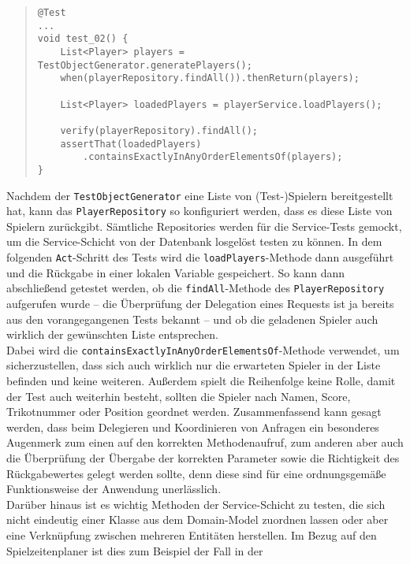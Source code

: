 \pagebreak

\begin{quote}
\begin{verbatim}
@Test
...
void test_02() {
    List<Player> players = TestObjectGenerator.generatePlayers();
    when(playerRepository.findAll()).thenReturn(players);

    List<Player> loadedPlayers = playerService.loadPlayers();

    verify(playerRepository).findAll();
    assertThat(loadedPlayers)
        .containsExactlyInAnyOrderElementsOf(players);
}
\end{verbatim}
\end{quote}

Nachdem der \texttt{TestObjectGenerator} eine Liste von (Test-)Spielern 
bereitgestellt hat, kann das \texttt{PlayerRepository} so konfiguriert werden, dass 
es diese Liste von Spielern zurückgibt. Sämtliche Repositories werden für die 
Service-Tests gemockt, um die Service-Schicht von der Datenbank losgelöst testen zu 
können. In dem folgenden \texttt{Act}-Schritt des Tests wird die 
\texttt{loadPlayers}-Methode dann ausgeführt und die Rückgabe in einer lokalen 
Variable gespeichert. So kann dann abschließend getestet werden, ob die 
\texttt{findAll}-Methode des \texttt{PlayerRepository} aufgerufen wurde -- die 
Überprüfung der Delegation eines Requests ist ja bereits aus den vorangegangenen 
Tests bekannt -- und ob die geladenen Spieler auch wirklich der gewünschten Liste 
entsprechen. \\ 
Dabei wird die \texttt{containsExactlyInAnyOrderElementsOf}-Methode verwendet, um 
sicherzustellen, dass sich auch wirklich nur die erwarteten Spieler in der Liste 
befinden und keine weiteren. Außerdem spielt die Reihenfolge keine Rolle, damit der 
Test auch weiterhin besteht, sollten die Spieler nach Namen, Score, Trikotnummer oder 
Position geordnet werden. 
Zusammenfassend kann gesagt werden, dass beim Delegieren und Koordinieren von 
Anfragen ein besonderes Augenmerk zum einen auf den korrekten Methodenaufruf, zum 
anderen aber auch die Überprüfung der Übergabe der korrekten Parameter sowie 
die Richtigkeit des Rückgabewertes gelegt werden sollte, denn diese sind für eine 
ordnungsgemäße Funktionsweise der Anwendung unerlässlich. \\ 
Darüber hinaus ist es wichtig Methoden der Service-Schicht zu testen, die sich nicht 
eindeutig einer Klasse aus dem Domain-Model zuordnen lassen oder aber eine 
Verknüpfung zwischen mehreren Entitäten herstellen. Im Bezug auf den 
Spielzeitenplaner ist dies zum Beispiel der Fall in der
